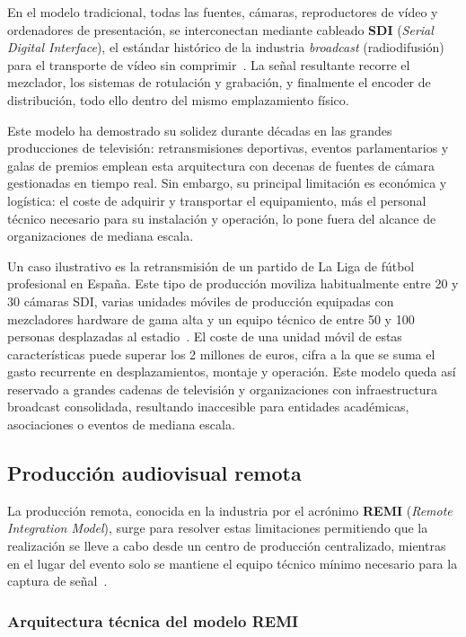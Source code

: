 En el modelo tradicional, todas las fuentes, cámaras, reproductores de vídeo y
ordenadores de presentación, se interconectan mediante cableado \textbf{SDI}
(\textit{Serial Digital Interface}), el estándar histórico de la industria \textit{broadcast} (radiodifusión)
para el transporte de vídeo sin comprimir~\cite{smpte_sdi}. La señal resultante recorre
el mezclador, los sistemas de rotulación y grabación, y finalmente el encoder de
distribución, todo ello dentro del mismo emplazamiento físico.

Este modelo ha demostrado su solidez durante décadas en las grandes producciones de
televisión: retransmisiones deportivas, eventos parlamentarios y galas de premios
emplean esta arquitectura con decenas de fuentes de cámara gestionadas en tiempo real.
Sin embargo, su principal limitación es económica y logística: el coste de adquirir y
transportar el equipamiento, más el personal técnico necesario para su instalación y
operación, lo pone fuera del alcance de organizaciones de mediana escala.

Un caso ilustrativo es la retransmisión de un partido de La Liga de fútbol profesional
en España. Este tipo de producción moviliza habitualmente entre 20 y 30 cámaras SDI,
varias unidades móviles de producción equipadas con mezcladores hardware de gama alta
y un equipo técnico de entre 50 y 100 personas desplazadas al estadio~\cite{blackmagic_atem}.
El coste de una unidad móvil de estas características puede superar los 2 millones de
euros, cifra a la que se suma el gasto recurrente en desplazamientos, montaje y
operación. Este modelo queda así reservado a grandes cadenas de televisión y
organizaciones con infraestructura broadcast consolidada, resultando inaccesible para
entidades académicas, asociaciones o eventos de mediana escala.

\subsection{Producción audiovisual remota}

La producción remota, conocida en la industria por el acrónimo
\textbf{REMI} (\textit{Remote Integration Model}), surge para resolver estas
limitaciones permitiendo que la realización se lleve a cabo desde un centro de
producción centralizado, mientras en el lugar del evento solo se mantiene el equipo
técnico mínimo necesario para la captura de
señal~\cite{tmbroadcast_remi,remi_workflow_ibc2023}.

\subsubsection*{Arquitectura técnica del modelo REMI}

